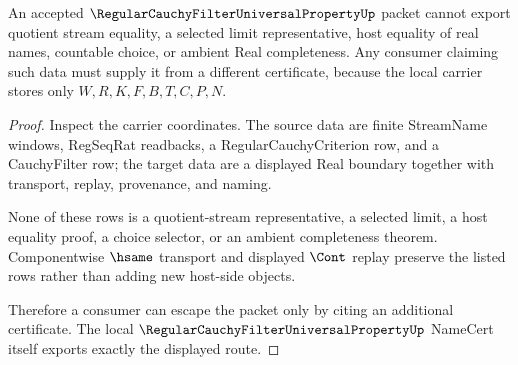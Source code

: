 \begin{theorem}
\label{thm:regular-cauchy-filter-universal-property-nonescape}
An accepted $\RegularCauchyFilterUniversalPropertyUp$ packet cannot export quotient stream equality, a selected limit representative, host equality of real names, countable choice, or ambient Real completeness. Any consumer claiming such data must supply it from a different certificate, because the local carrier stores only $W,R,K,F,B,T,C,P,N$.
\end{theorem}
\begin{proof}
Inspect the carrier coordinates. The source data are finite StreamName windows, RegSeqRat readbacks, a RegularCauchyCriterion row, and a CauchyFilter row; the target data are a displayed Real boundary together with transport, replay, provenance, and naming.

None of these rows is a quotient-stream representative, a selected limit, a host equality proof, a choice selector, or an ambient completeness theorem. Componentwise $\hsame$ transport and displayed $\Cont$ replay preserve the listed rows rather than adding new host-side objects.

Therefore a consumer can escape the packet only by citing an additional certificate. The local $\RegularCauchyFilterUniversalPropertyUp$ NameCert itself exports exactly the displayed route.
\end{proof}




